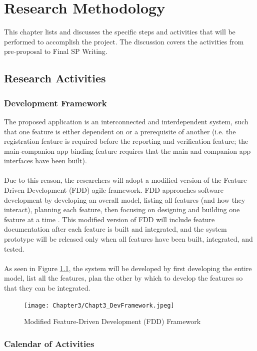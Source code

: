 \chapter{Research Methodology}
This chapter lists and discusses the specific steps and activities that will be performed  to accomplish the project. 
The discussion covers the activities from pre-proposal to Final SP Writing.

\section{Research Activities}
\subsection{Development Framework}
The proposed application is an interconnected and interdependent system, such that one feature is either dependent on or a prerequisite of another (i.e. the registration feature is required before the reporting and verification feature; the main-companion app binding feature requires that the main and companion app interfaces have been built).
\\\\Due to this reason, the researchers will adopt a modified version of the Feature-Driven Development (FDD) agile framework. FDD approaches software development by developing an overall model, listing all features (and how they interact), planning each feature, then focusing on designing and building one feature at a time \cite{productplan2022}. This modified version of FDD will include feature documentation after each feature is built and integrated, and the system prototype will be released only when all features have been built, integrated, and tested.
\\\\As seen in Figure \ref{fig:FDDFramework}, the system will be developed by first developing the entire model, list all the features, plan the other by which to develop the features so that they can be integrated.

\begin{figure}[!h]
    \centering
    \texttt{[image: Chapter3/Chapt3\_DevFramework.jpeg]}
    \caption{Modified Feature-Driven Development (FDD) Framework}
    \label{fig:FDDFramework}
\end{figure}

\subsection{Calendar of Activities}

